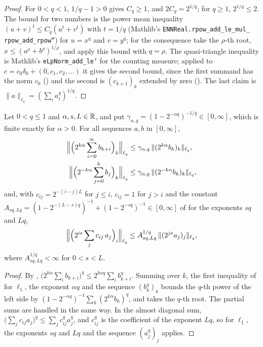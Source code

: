 \begin{proof}
\leanok
For $0 < q < 1$, $1/q - 1 > 0$ gives $C_q \geq 1$, and $2 C_q = 2^{1/q}$; for $q \geq 1$,
$2^{1/q} \leq 2$. The bound for two numbers is the power mean inequality
$(u + v)^{t} \leq C_q (u^{t} + v^{t})$ with $t = 1/q$ (Mathlib's
\texttt{ENNReal.\allowbreak rpow\_\allowbreak add\_\allowbreak le\_\allowbreak mul\_\allowbreak
rpow\_\allowbreak add\_\allowbreak rpow''}) for $u = x^q$ and $v = y^q$; for the consequence take
the $\rho$-th root, $x \leq (a^\rho + b^\rho)^{1/\rho}$, and apply this bound with $q = \rho$. The
quasi-triangle
inequality is Mathlib's \texttt{eLpNorm\_\allowbreak add\_\allowbreak le'} for the counting
measure; applied to $c = c_0 \delta_0 + (0, c_1, c_2, \dots)$ it gives the second bound, since the
first summand has the norm $c_0$ () and the second is $(c_{k+1})_k$ extended
by zero (). The last claim is
$\|a\|_{\ell_q} = (\sum_i a_i^q)^{1/q}$.
\end{proof}

\begin{lemma}
\label{lem:hardy-below-one}
\leanok
{}
Let $0 < q \leq 1$ and $\alpha, s, L \in \mathbb{R}$, and put
$\gamma_{\alpha, q} = (1 - 2^{-\alpha q})^{-1/q} \in [0, \infty]$, which is finite exactly for
$\alpha > 0$. For all sequences $a, b$ in $[0, \infty]$,
\begin{align*}
  \Bigl\| \Bigl(2^{k\alpha} \sum_{i=0}^\infty b_{k+i}\Bigr)_k \Bigr\|_{\ell_q}
  &\leq \gamma_{\alpha, q} \, \|(2^{k\alpha} b_k)_k\|_{\ell_q} , \\
  \Bigl\| \Bigl(2^{-k\alpha} \sum_{j=0}^{k} b_j\Bigr)_k \Bigr\|_{\ell_q}
  &\leq \gamma_{\alpha, q} \, \|(2^{-k\alpha} b_k)_k\|_{\ell_q} ,
\end{align*}
and, with $c_{ij} = 2^{-(i-j)L}$ for $j \leq i$, $c_{ij} = 1$ for $j > i$ and the constant
$A_{sq, Lq} = (1 - 2^{-(L-s)q})^{-1} + (1 - 2^{-sq})^{-1} \in [0, \infty]$ of
 for the exponents $sq$ and $Lq$,
\[
  \Bigl\| \Bigl( 2^{is} \sum_j c_{ij} \, a_j \Bigr)_i \Bigr\|_{\ell_q}
  \leq A_{sq, Lq}^{1/q} \, \|(2^{js} a_j)_j\|_{\ell_q} ,
\]
where $A_{sq, Lq}^{1/q} < \infty$ for $0 < s < L$.
\end{lemma}

\begin{proof}
\leanok
By ,
$\bigl(2^{k\alpha} \sum_i b_{k+i}\bigr)^q \leq 2^{k\alpha q} \sum_i b_{k+i}^q$. Summing over $k$,
the first inequality of  for $\ell_1$, the exponent $\alpha q$ and the sequence
$(b_k^q)_k$ bounds the $q$-th power of the left side by
$(1 - 2^{-\alpha q})^{-1} \sum_k (2^{k\alpha} b_k)^q$, and  takes
the $q$-th root. The partial sums are handled in the same way. In the almost diagonal sum,
$\bigl(\sum_j c_{ij} a_j\bigr)^q \leq \sum_j c_{ij}^q a_j^q$, and $c_{ij}^q$ is the coefficient of
the exponent $Lq$, so  for $\ell_1$, the exponents $sq$ and $Lq$ and the
sequence $(a_j^q)_j$ applies.
\end{proof}

